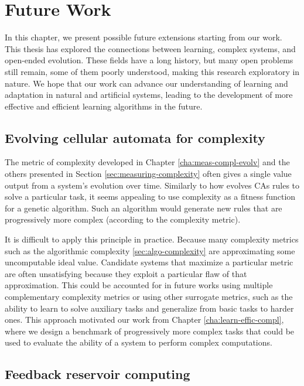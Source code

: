 \chapter{Future Work}\label{cha:future_work}

In this chapter, we present possible future extensions starting from our work.
This thesis has explored the connections between learning, complex systems, and
open-ended evolution. These fields have a long history, but many open problems
still remain, some of them poorly understood, making this research exploratory
in nature. We hope that our work can advance our understanding of learning and
adaptation in natural and artificial systems, leading to the development of more
effective and efficient learning algorithms in the future.

\section{Evolving cellular automata for complexity}

The metric of complexity developed in Chapter \ref{cha:meas-compl-evolv} and the
others presented in Section \ref{sec:measuring-complexity} often gives a single
value output from a system's evolution over time. Similarly to how
\textcite{mitchellEvolvingCellularAutomata1996} evolves \acp{CA} rules to solve
a particular task, it seems appealing to use complexity as a fitness
function for a genetic algorithm. Such an algorithm would generate new rules
that are progressively more complex (according to the complexity metric).

It is difficult to apply this principle in practice. Because many complexity metrics such as the algorithmic complexity \ref{sec:algo-complexity} are approximating some uncomputable ideal value. Candidate systems that maximize a particular metric are often unsatisfying because they exploit a particular flaw of that approximation. This could be accounted for in future
works using multiple complementary complexity metrics or using other surrogate
metrics, such as the ability to learn to solve auxiliary tasks and generalize from basic tasks to harder ones.
This approach motivated our work from Chapter \ref{cha:learn-effic-compl}, where
we design a benchmark of progressively more complex tasks that could be used to
evaluate the ability of a system to perform complex computations.

\section{Feedback reservoir computing}

